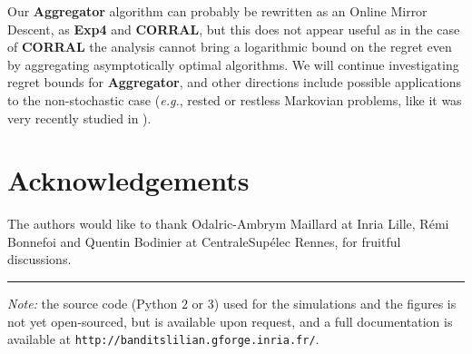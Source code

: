 \documentclass[conference]{IEEEtran}
\theoremstyle{plain}  %
\newcommand{\eg}{\emph{e.g.}}
\newcommand{\Aggr}[0]{\textbf{Aggregator}}
\newcommand{\ExpQ}[0]{\textbf{Exp4}}
\newcommand{\CORRAL}[0]{\textbf{CORRAL}}
\newcommand{\hr}{\begin{center}\rule{0.5\linewidth}{\linethickness}\end{center}}
\begin{document}
Our \Aggr{} algorithm can probably be rewritten as an Online Mirror Descent, as \ExpQ{} and \CORRAL,
but this does not appear useful as in the case of \CORRAL{}  the analysis cannot bring a logarithmic bound on the regret even by aggregating asymptotically optimal algorithms.
We will continue investigating regret bounds for \Aggr,
and other directions include possible applications to the non-stochastic case (\eg, rested or restless Markovian problems, like it was very recently studied in \cite{Luo17}).



\newpage
\section{Acknowledgements}\label{sec:thanks}
	The authors would like to thank Odalric-Ambrym Maillard at Inria Lille,
	R{\'e}mi Bonnefoi and Quentin Bodinier at CentraleSup{\'e}lec Rennes, for fruitful discussions.





	
	

		\hr{}
		\emph{Note:} the source code (Python $2$ or $3$) used for the simulations and the figures is not yet open-sourced, but is available upon request,
		and a full documentation is available at
		\texttt{http://banditslilian.gforge.inria.fr/}.
\end{document}
